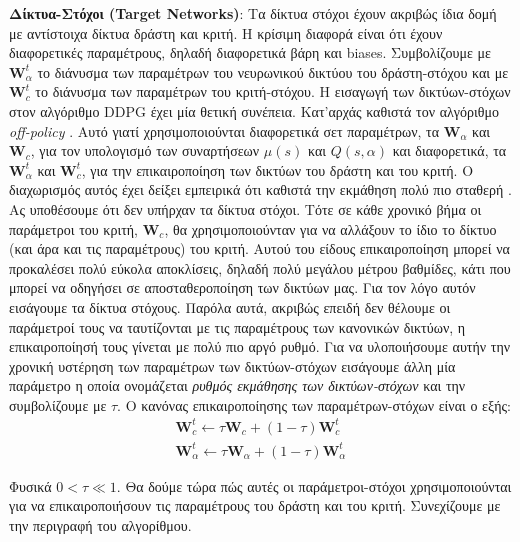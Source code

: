 \documentclass[11pt]{article} %
\numberwithin{equation}{subsection}
\begin{document}
\textbf{Δίκτυα-Στόχοι (Target Networks)}: Τα δίκτυα στόχοι έχουν ακριβώς ίδια δομή με αντίστοιχα δίκτυα δράστη και κριτή. Η κρίσιμη διαφορά είναι ότι έχουν διαφορετικές παραμέτρους, δηλαδή διαφορετικά βάρη και biases. Συμβολίζουμε με $\textbf{W}_{α}^{t}$ το διάνυσμα των παραμέτρων του νευρωνικού δικτύου του δράστη-στόχου και με $\textbf{W}_{c}^{t}$ το διάνυσμα των παραμέτρων του κριτή-στόχου. Η εισαγωγή των δικτύων-στόχων στον αλγόριθμο DDPG έχει μία θετική συνέπεια. Κατ'αρχάς καθιστά τον αλγόριθμο \textit{off-policy} \cite{deepmind}. Αυτό γιατί χρησιμοποιούνται διαφορετικά σετ παραμέτρων, τα $\textbf{W}_{α}$ και $\textbf{W}_{c}$, για τον υπολογισμό των συναρτήσεων $\mu(s)$ και $Q(s,\alpha)$ και διαφορετικά, τα $\textbf{W}_{α}^{t}$ και $\textbf{W}_{c}^{t}$, για την επικαιροποίηση των δικτύων του δράστη και του κριτή. Ο διαχωρισμός αυτός έχει δείξει εμπειρικά ότι καθιστά την εκμάθηση πολύ πιο σταθερή \cite{atari}. Ας υποθέσουμε ότι δεν υπήρχαν τα δίκτυα στόχοι. Τότε σε κάθε χρονικό βήμα οι παράμετροι του κριτή, $\textbf{W}_{c}$, θα χρησιμοποιούνταν για να αλλάξουν το ίδιο το δίκτυο (και άρα και τις παραμέτρους) του κριτή. Αυτού του είδους επικαιροποίηση μπορεί να προκαλέσει πολύ εύκολα αποκλίσεις, δηλαδή πολύ μεγάλου μέτρου βαθμίδες, κάτι που μπορεί να οδηγήσει σε αποσταθεροποίηση των δικτύων μας. Για τον λόγο αυτόν εισάγουμε τα δίκτυα στόχους. Παρόλα αυτά, ακριβώς επειδή δεν θέλουμε οι παράμετροί τους να ταυτίζονται με τις παραμέτρους των κανονικών δικτύων, η επικαιροποίησή τους γίνεται με πολύ πιο αργό ρυθμό. Για να υλοποιήσουμε αυτήν την χρονική υστέρηση των παραμέτρων των δικτύων-στόχων εισάγουμε άλλη μία παράμετρο η οποία ονομάζεται \textit{ρυθμός εκμάθησης των δικτύων-στόχων} και την συμβολίζουμε με $\tau$. Ο κανόνας επικαιροποίησης των παραμέτρων-στόχων είναι ο εξής:\\
\begin{gather}
\textbf{W}_c ^ t \leftarrow \tau \textbf{W}_c + (1-\tau)\textbf{W}_c ^t\\
\textbf{W}_α ^ t \leftarrow \tau \textbf{W}_α + (1-\tau) \textbf{W}_α ^t
\end{gather}

Φυσικά $0 < \tau \ll 1$. Θα δούμε τώρα πώς αυτές οι παράμετροι-στόχοι χρησιμοποιούνται για να επικαιροποιήσουν τις παραμέτρους του δράστη και του κριτή. Συνεχίζουμε με την περιγραφή του αλγορίθμου.\\
\end{document}
